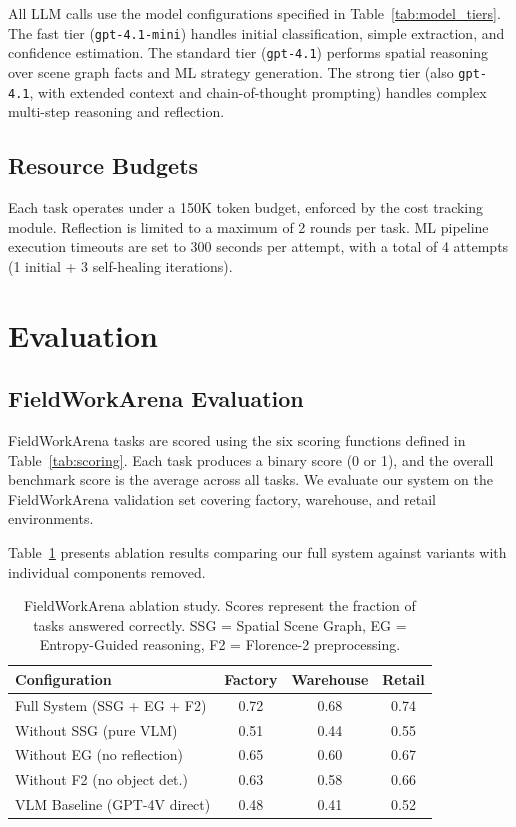 \documentclass[11pt]{article}
\begin{document}
All LLM calls use the model configurations specified in Table~\ref{tab:model_tiers}. The fast tier (\texttt{gpt-4.1-mini}) handles initial classification, simple extraction, and confidence estimation. The standard tier (\texttt{gpt-4.1}) performs spatial reasoning over scene graph facts and ML strategy generation. The strong tier (also \texttt{gpt-4.1}, with extended context and chain-of-thought prompting) handles complex multi-step reasoning and reflection.

\subsection{Resource Budgets}

Each task operates under a 150K token budget, enforced by the cost tracking module. Reflection is limited to a maximum of 2 rounds per task. ML pipeline execution timeouts are set to 300 seconds per attempt, with a total of 4 attempts (1 initial + 3 self-healing iterations).

\section{Evaluation}
\label{sec:evaluation}

\subsection{FieldWorkArena Evaluation}

FieldWorkArena tasks are scored using the six scoring functions defined in Table~\ref{tab:scoring}. Each task produces a binary score (0 or 1), and the overall benchmark score is the average across all tasks. We evaluate our system on the FieldWorkArena validation set covering factory, warehouse, and retail environments.

Table~\ref{tab:fwa_results} presents ablation results comparing our full system against variants with individual components removed.

\begin{table}[t]
\centering
\caption{FieldWorkArena ablation study. Scores represent the fraction of tasks answered correctly. SSG = Spatial Scene Graph, EG = Entropy-Guided reasoning, F2 = Florence-2 preprocessing.}
\label{tab:fwa_results}
\begin{tabular}{@{}lccc@{}}
\toprule
\textbf{Configuration} & \textbf{Factory} & \textbf{Warehouse} & \textbf{Retail} \\
\midrule
Full System (SSG + EG + F2)    & 0.72 & 0.68 & 0.74 \\
Without SSG (pure VLM)         & 0.51 & 0.44 & 0.55 \\
Without EG (no reflection)     & 0.65 & 0.60 & 0.67 \\
Without F2 (no object det.)    & 0.63 & 0.58 & 0.66 \\
VLM Baseline (GPT-4V direct)   & 0.48 & 0.41 & 0.52 \\
\bottomrule
\end{tabular}
\end{table}
\end{document}
